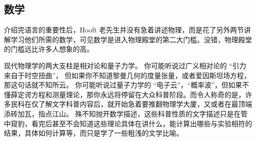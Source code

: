 \subsection{数学}
介绍完语言的重要性后，Hooft 老先生并没有急着讲述物理，而是花了另外两节讲解学习他们所需的数学，可见数学是进入物理殿堂的第二大门槛。没错，物理殿堂的门槛远比许多人想象的高。

现代物理学的两大支柱是相对论和量子力学。 你可能听说过广义相对论的 “引力来自于时空扭曲”， 但如果你不知道黎曼几何的度量张量，或者爱因斯坦场方程，那这句话就不知所云。 你可能听说过量子力学的 “电子云”，“概率波”，但如果不懂薛定谔方程和测量理论，那你永远将停留在大众科普阶段。而令人称奇的是，许多民科在仅了解文字科普内容后，就开始急着要推翻物理学大厦，又或者在最顶端添砖加瓦，指点江山。 殊不知抛开数学描述，这些科普性质的文字描述只是在管中窥豹，看完后甚至不会知道这些理论具体在讲什么，能计算出哪些与实验相符的结果，具体如何计算等，而只是学了一些粗浅的文学比喻。

